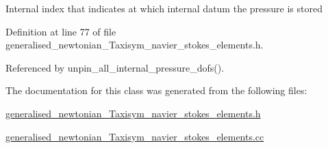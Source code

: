 Internal index that indicates at which internal datum the pressure is stored 

Definition at line 77 of file generalised\+\_\+newtonian\+\_\+\+Taxisym\+\_\+navier\+\_\+stokes\+\_\+elements.\+h.



Referenced by unpin\+\_\+all\+\_\+internal\+\_\+pressure\+\_\+dofs().



The documentation for this class was generated from the following files\+:\begin{DoxyCompactItemize}
\item 
\hyperlink{generalised__newtonian__Taxisym__navier__stokes__elements_8h}{generalised\+\_\+newtonian\+\_\+\+Taxisym\+\_\+navier\+\_\+stokes\+\_\+elements.\+h}\item 
\hyperlink{generalised__newtonian__Taxisym__navier__stokes__elements_8cc}{generalised\+\_\+newtonian\+\_\+\+Taxisym\+\_\+navier\+\_\+stokes\+\_\+elements.\+cc}\end{DoxyCompactItemize}
